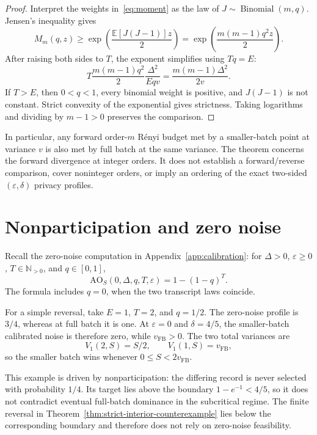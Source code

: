 \documentclass[11pt]{article}
\theoremstyle{remark}
\newcommand{\N}{\mathbb N}
\newcommand{\E}{\mathbb E}
\newcommand{\AO}{\mathrm{AO}}
\begin{document}
\begin{proof}
Interpret the weights in~\eqref{eq:moment} as the law of
$J\sim\operatorname{Binomial}(m,q)$. Jensen's inequality gives
\[
 M_m(q,z)\geq\exp\left(\frac{\E[J(J-1)]z}{2}\right)
 =\exp\left(\frac{m(m-1)q^2z}{2}\right).
\]
After raising both sides to $T$, the exponent simplifies using $Tq=E$:
\[
 T\frac{m(m-1)q^2}{2}\frac{\Delta^2}{Eqv}
 =\frac{m(m-1)\Delta^2}{2v}.
\]
If $T>E$, then $0<q<1$, every binomial weight is positive, and $J(J-1)$ is
not constant. Strict convexity of the exponential gives strictness. Taking
logarithms and dividing by $m-1>0$ preserves the comparison.
\end{proof}

In particular, any forward order-$m$ R\'enyi budget met by a smaller-batch
point at variance $v$ is also met by full batch at the same variance.
The theorem concerns the forward divergence at integer orders. It does not
establish a forward/reverse comparison, cover noninteger orders, or imply
an ordering of the exact two-sided $(\varepsilon,\delta)$ privacy profiles.

\section{Nonparticipation and zero noise}\label{app:zero-noise}
Recall the zero-noise computation in Appendix~\ref{app:calibration}:
for $\Delta>0$, $\varepsilon\geq0$, $T\in\N_{>0}$, and $q\in[0,1]$,
\begin{equation}\label{eq:zero-noise-profile}
 \AO_S(0,\Delta,q,T,\varepsilon)=1-(1-q)^T.
\end{equation}
The formula includes $q=0$, when the two transcript laws coincide.

For a simple reversal, take $E=1$, $T=2$, and $q=1/2$. The zero-noise profile
is $3/4$, whereas at full batch it is one. At $\varepsilon=0$ and
$\delta=4/5$, the smaller-batch calibrated noise is therefore zero, while
$v_{\mathrm{FB}}>0$. The two total variances are
\[
 V_1(2,S)=S/2,\qquad V_1(1,S)=v_{\mathrm{FB}},
\]
so the smaller batch wins whenever $0\leq S<2v_{\mathrm{FB}}$.

This example is driven by nonparticipation: the differing record is never
selected with probability $1/4$. Its target lies above the boundary
$1-e^{-1}<4/5$, so it does not contradict eventual full-batch dominance in
the subcritical regime. The finite reversal in
Theorem~\ref{thm:strict-interior-counterexample} lies below the corresponding
boundary and therefore does not rely on zero-noise feasibility.
\end{document}
